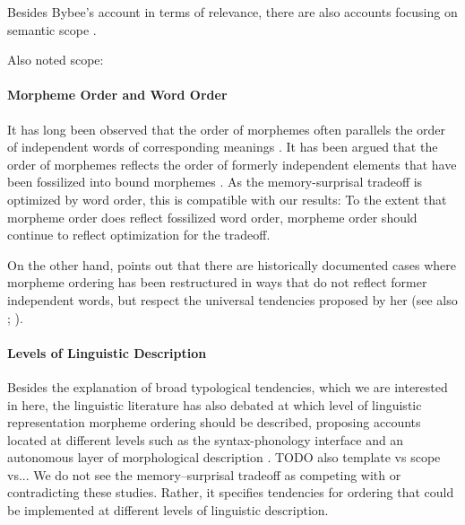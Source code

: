 \documentclass[11pt,letterpaper]{article}
\begin{document}
Besides Bybee's account in terms of relevance, there are also accounts focusing on semantic scope \citep{rice2000morpheme}.

Also noted scope: \citep{baker1988incorporation,foley1984functional,chierchia1990meaning,valin1992a}



\paragraph{Morpheme Order and Word Order}
It has long been observed that the order of morphemes often parallels the order of independent words of corresponding meanings \citep{givon1971historical,venneman1973explanation,baker1985the}.
It has been argued that the order of morphemes reflects the order of formerly independent elements that have been fossilized into bound morphemes \citet{givon1971historical,venneman1973explanation}.
As the memory-surprisal tradeoff is optimized by word order, this is compatible with our results:
To the extent that morpheme order does reflect fossilized word order, morpheme order should continue to reflect optimization for the tradeoff.

On the other hand, \citet{bybee-morphology-1985} points out that there are historically documented cases where morpheme ordering has been restructured in ways that do not reflect former independent words, but respect the universal tendencies proposed by her (see also \citet{mithun2000the, haspelmath1993the, mithun1995affixation}; \citet[Section 15]{rice2000morpheme}).


\paragraph{Levels of Linguistic Description}
Besides the explanation of broad typological tendencies, which we are interested in here, the linguistic literature has also debated at which level of linguistic representation morpheme ordering should be described, proposing accounts located at different levels such as the syntax-phonology interface \citep{baker1985the} and an autonomous layer of morphological description \citep{hyman2003suffix}.
TODO also template vs scope vs...
We do not see the memory--surprisal tradeoff as competing with or contradicting these studies.
Rather, it specifies tendencies for ordering that could be implemented at different levels of linguistic description.
\end{document}
